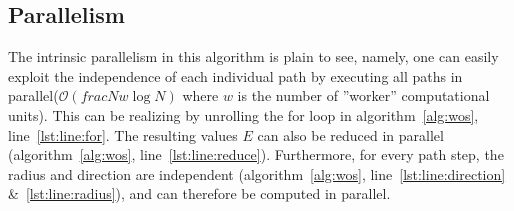 %
%




\subsection{Parallelism}

The intrinsic parallelism in this algorithm is plain to see, namely, one can easily
exploit the independence of each individual path by executing all paths in parallel($\mathcal{O}(frac{N}{w} \log{}N)$ where $w$ is the number of ''worker'' computational units).
This can be realizing by unrolling the for loop in algorithm~\ref{alg:wos}, line~\ref{lst:line:for}.
The resulting values $E$ can also be reduced in parallel (algorithm~\ref{alg:wos}, line~\ref{lst:line:reduce}).  Furthermore, for every path step,
the radius and direction are independent (algorithm~\ref{alg:wos}, line~\ref{lst:line:direction} \&~\ref{lst:line:radius}),
 and can therefore be computed in parallel. \cite{Muller,DeLaurentis,Bornemann}

